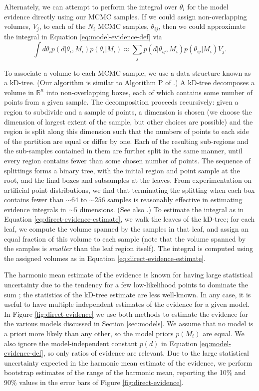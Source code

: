 \documentclass[preprint]{aastex}
\begin{document}
Alternately, we can attempt to perform the integral over $\theta_i$
for the model evidence directly using our MCMC samples.  If we could
assign non-overlapping volumes, $V_j$, to each of the $N_i$ MCMC
samples, $\theta_{ij}$, then we could approximate the integral in
Equation \eqref{eq:model-evidence-def} via
\begin{equation}
  \label{eq:direct-evidence-estimate}
  \int d\theta_i
  p(d|\theta_i,M_i) p(\theta_i|M_i) \approx \sum_j
  p(d|\theta_{ij},M_i) p(\theta_{ij}|M_i) V_j.
\end{equation}

To associate a volume to each MCMC sample, we use a data structure
known as a kD-tree.  (Our algorithm is similar to Algorithm P of
\citet{Weinberg2010}.)  A kD-tree decomposes a volume in
$\mathbb{R}^n$ into non-overlapping boxes, each of which contains some
number of points from a given sample.  The decomposition proceeds
recursively: given a region to subdivide and a sample of points, a
dimension is chosen (we choose the dimension of largest extent of the
sample, but other choices are possible) and the region is split along
this dimension such that the numbers of points to each side of the
partition are equal or differ by one.  Each of the resulting
sub-regions and the sub-samples contained in them are further split in
the same manner, until every region contains fewer than some chosen
number of points.  The sequence of splittings forms a binary tree,
with the initial region and point sample at the root, and the final
boxes and subsamples at the leaves.  From experimentation on
artificial point distributions, we find that terminating the splitting
when each box contains fewer than $\sim 64$ to $\sim 256$ samples is
reasonably effective in estimating evidence integrals in $\sim 5$
dimensions.  (See also \citet{Weinberg2010}.)  To estimate the
integral as in Equation \eqref{eq:direct-evidence-estimate}, we walk
the leaves of the kD-tree; for each leaf, we compute the volume
spanned by the samples in that leaf, and assign an equal fraction of
this volume to each sample (note that the volume spanned by the
samples is \emph{smaller} than the leaf region itself).  The integral
is computed using the assigned volumes as in Equation
\eqref{eq:direct-evidence-estimate}.

The harmonic mean estimate of the evidence is known for having large
statistical uncertainty due to the tendency for a few low-likelihood
points to dominate the sum \citep{Weinberg2010}; the statistics of the
kD-tree estimate are less well-known.  In any case, it is useful to
have multiple independent estimates of the evidence for a given model.
In Figure \ref{fig:direct-evidence} we use both methods to estimate
the evidence for the various models discussed in Section
\ref{sec:models}.  We assume that no model is a priori more likely
than any other, so the model priors $p(M_i)$ are equal.  We also
ignore the model-independent constant $p(d)$ in Equation
\eqref{eq:model-evidence-def}, so only ratios of evidence are
relevant.  Due to the large statistical uncertainty expected in the
harmonic mean estimate of the evidence, we perform bootstrap estimates
of the range of the harmonic mean, reporting the 10\% and 90\% values
in the error bars of Figure \ref{fig:direct-evidence}.
\end{document}

